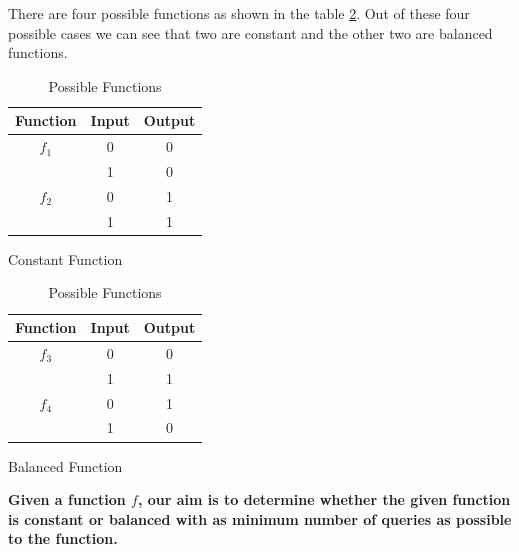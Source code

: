 \documentclass[12pt, oneside]{book}
\theoremstyle{definition}
\theoremstyle{definition}
\theoremstyle{remark}
\begin{document}
There are four possible functions as shown in the table \ref{tab:Deutsch}. Out of these four possible cases we can see that two are constant and the other two are balanced functions.

\begin{table}[h]
    \centering
     \begin{subtable}[b]{0.45\linewidth}
        \centering
          \begin{tabular}{|c|c|c|}
            \hline
             Function & Input & Output \\
            \hline
              $f_1$& 0 & 0 \\
              & 1 & 0 \\
             \hline
               $f_2$& 0 & 1 \\
               & 1 & 1 \\
              \hline
           \end{tabular}
           \caption{Constant Function}
        \end{subtable}%
     \begin{subtable}[b]{0.45\linewidth}
            \centering
            \begin{tabular}{|c|c|c|}
                \hline
                Function & Input & Output \\
                \hline
                $f_3$& 0 & 0 \\
                & 1 & 1 \\
                \hline
                $f_4$& 0 & 1 \\
                & 1 & 0 \\
                \hline
            \end{tabular}
            \caption{Balanced Function}
        \end{subtable}
        \caption{Possible Functions}
        \label{tab:Deutsch}
\end{table}

\textbf{Given a function $f$, our aim is to determine whether the given function is constant or balanced with as minimum number of queries as possible to the function.}
\end{document}
